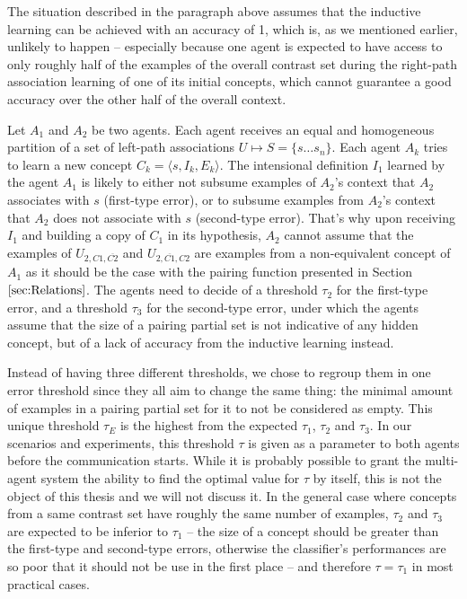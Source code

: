 The situation described in the paragraph above assumes that the inductive learning can be achieved with an accuracy of 1, which is, as we mentioned earlier, unlikely to happen -- especially because one agent is expected to have access to only roughly half of the examples of the overall contrast set during the right-path association learning of one of its initial concepts, which cannot guarantee a good accuracy over the other half of the overall context. 

Let $A_{1}$ and $A_{2}$ be two agents. Each agent receives an equal and homogeneous partition of a set of left-path associations $U \mapsto S = \{s \ldots s_{n} \}$. Each agent $A_{k}$ tries to learn a new concept $C_{k} = \langle s, I_{k}, E_{k} \rangle$. The intensional definition $I_{1}$ learned by the agent $A_{1}$ is likely to either not subsume examples of $A_{2}$'s context that $A_{2}$ associates with $s$ (first-type error), or to subsume examples from $A_{2}$'s context that $A_{2}$ does not associate with $s$ (second-type error). That's why upon receiving $I_{1}$ and building a copy of $C_{1}$ in its hypothesis, $A_{2}$ cannot assume that the examples of $U_{2,C1,\overbar{C2}}$ and $U_{2,\overbar{C1},C2}$ are examples from a non-equivalent concept of $A_{1}$ as it should be the case with the pairing function presented in Section $\ref{sec:Relations}$. The agents need to decide of a threshold $\tau_{2}$ for the first-type error, and a threshold $\tau_{3}$ for the second-type error, under which the agents assume that the size of a pairing partial set is not indicative of any hidden concept, but of a lack of accuracy from the inductive learning instead.

Instead of having three different thresholds, we chose to regroup them in one error threshold since they all aim to change the same thing: the minimal amount of examples in a pairing partial set for it to not be considered as empty. This unique threshold $\tau_{E}$ is the highest from the expected $\tau_{1}$, $\tau_{2}$ and $\tau_{3}$. In our scenarios and experiments, this threshold $\tau$ is given as a parameter to both agents before the communication starts. While it is probably possible to grant the multi-agent system the ability to find the optimal value for $\tau$ by itself, this is not the object of this thesis and we will not discuss it. In the general case where concepts from a same contrast set have roughly the same number of examples, $\tau_{2}$ and $\tau_{3}$ are expected to be inferior to $\tau_{1}$ -- the size of a concept should be greater than the first-type and second-type errors, otherwise the classifier's performances are so poor that it should not be use in the first place -- and therefore $\tau = \tau_{1}$ in most practical cases.

